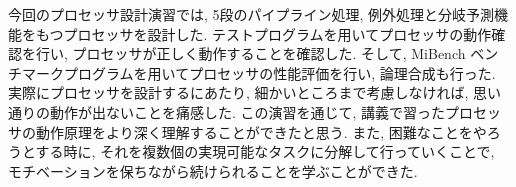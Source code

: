 \documentclass[../main.tex]{subfiles}
\begin{document}
  今回のプロセッサ設計演習では, 5段のパイプライン処理, 例外処理と分岐予測機能をもつプロセッサを設計した.
  テストプログラムを用いてプロセッサの動作確認を行い, プロセッサが正しく動作することを確認した.
  そして, MiBench ベンチマークプログラムを用いてプロセッサの性能評価を行い, 論理合成も行った.
  実際にプロセッサを設計するにあたり, 細かいところまで考慮しなければ, 思い通りの動作が出ないことを痛感した.
  この演習を通じて, 講義で習ったプロセッサの動作原理をより深く理解することができたと思う.
  また, 困難なことをやろうとする時に, それを複数個の実現可能なタスクに分解して行っていくことで, 
  モチベーションを保ちながら続けられることを学ぶことができた.
\end{document}
